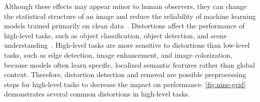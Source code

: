 \documentclass[10pt,letterpaper]{article}
\begin{document}
Although these effects may
appear minor to human observers, they can change the statistical structure of an image and reduce
the reliability of machine learning models trained primarily on clean
data~\cite{muhammadaliqureshiDistortionClassificationComputer}. Distortions affect the
performance of high-level tasks, such as object classification, object detection, and scene
understanding~\cite{muhammadaliqureshiDistortionClassificationComputer}. High-level tasks are more sensitive to distortions than low-level tasks, such as 
edge detection, image enhancement, and image colorization, because models often learn specific, localized semantic features rather than global context.
Therefore, distortion detection and removal are possible preprocessing steps for high-level tasks to decrease the
impact on performance. \autoref{fig:nine-grid} demonstrates several common distortions in high-level tasks.
\end{document}

